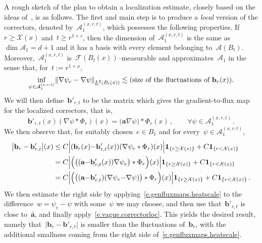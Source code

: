 \documentclass[11pt,twoside]{article} %
\numberwithin{equation}{section}
\theoremstyle{definition}
\let\originalleft\left
\let\originalright\right
\renewcommand{\left}{\mathopen{}\mathclose\bgroup\originalleft}
\renewcommand{\right}{\aftergroup\egroup\originalright}
\newcommand{\eps}{\varepsilon}
\renewcommand{\b}{\ensuremath{\mathbf{b}}}
\newcommand{\ep}{\eps}
\renewcommand{\a}{\mathbf{a}}
\newcommand{\ahom}{\bar{\a}}
\newcommand{\F}{\mathcal{F}}
\newcommand{\X}{\mathcal{X}}
\newcommand{\indc}{\boldsymbol{1}}
\newcommand{\A}{\mathcal{A}}
\begin{document}
A rough sketch of the plan to obtain a localization estimate, closely based on the ideas of~\cite[Section 4.4]{AKMBook}, is as follows. The first and main step is to produce a \emph{local} version of the correctors, denoted by~$\mathcal{A}_1^{(x,r,t)}$, which possesses the following properties. If~$r \geq \X(x)$ and~$t\geq r^{1+\ep}$, then the dimension of~$\mathcal{A}_1^{(x,r,t)}$ is the same as~$\dim \A_1=d+1$ and it has a basis with every element belonging to~$\A(B_{t})$. Moreover,~$\mathcal{A}_1^{(x,r,t)}$ is~$\F(B_t(x))$--measurable and  approximates~$\A_1$ in the sense that, for~$t := r^{1+\rho}$, 
\begin{equation}
\label{e.vague.correctorloc}
\inf_{\psi \in  \mathcal{A}_1^{(x,r,t)}} \left\| \nabla \psi_{e} - \nabla \psi \right\|_{\underline{L}^2(B_{t}(x))} 
\lesssim \text{(size of the fluctuations of~$\b_r(x)$).}
\end{equation}
We will then define~$\b'_{r,t}$ to be the matrix which gives the gradient-to-flux map for the localized correctors, that is,
\begin{equation}
\label{e.local.coarsened}
\b'_{r,t} (x) (\nabla \psi   \ast \Phi_{r} )(x)
=
\bigl( \a \nabla \psi   \bigr)  \ast \Phi_{r}(x)
\,, 
\qquad 
\forall \psi \in \mathcal{A}_1^{(x,r,t)}\,.
\end{equation}
We then observe that, for suitably chosen~$e\in B_1$ and for every~$\psi \in \mathcal{A}_1^{(x,r,t)}$, 
\begin{align}
\label{e.localmagic}
\big| \b_r - \b'_{r,t} \big| (x) 
& 
\leq 
C
\Big| ( \b_r(x) {-} \b'_{r,t}(x)  )
(\nabla \psi_e  \ast \Phi_{r}) (x) \Big| \indc_{\{r \geq \X(x)\}} + C \indc_{\{r < \X(x)\}} 
\notag \\ & 
= 
C \Bigl| \Bigl(   \bigl(  ( \a {-} \b'_{r,t}(x) ) \nabla \psi_e \bigr) \ast \Phi_{r}  \Bigr) (x) \Bigr| \indc_{\{r \geq \X(x)\}} 
+ C \indc_{\{r < \X(x)\}}  
\notag \\ & 
=
C \Bigl| 
\Bigl(  \bigl( ( \a {-} \b'_{r,t}) ( \nabla \psi_{e} {-} \nabla \psi )\bigr) \ast \Phi_{r}  \Bigr)  (x) \Bigr|  \indc_{\{r \geq \X(x)\}} 
 + C \indc_{\{r < \X(x)\}} 
\,.
\end{align}
We then estimate the right side by applying~\eqref{e.genfluxmaps.heatscale} to the difference~$w=\psi_e - \psi$ with some~$\psi$ we may choose, and then use that~$\b'_{r,t}$ is close to~$\ahom$, and finally apply~\eqref{e.vague.correctorloc}. This yields the desired result, namely that~$\big| \b_r - \b'_{r,t} \big|$ is smaller than the fluctuations of~$\b_r$, with the additional smallness coming from the right side of~\eqref{e.genfluxmaps.heatscale}. 
\end{document}
